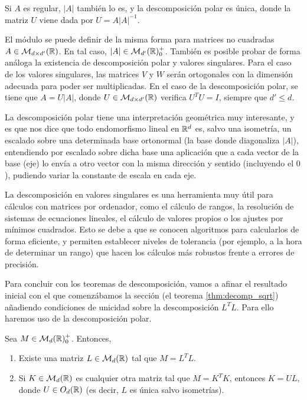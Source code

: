 \begin{remark}
    Si $A$ es regular, $|A|$ también lo es, y la descomposición polar es única, donde la matriz $U$ viene dada por $U = A|A|^{-1}$.
\end{remark}

\begin{remark} \label{rem:polar_generalized}
    El módulo se puede definir de la misma forma para matrices no cuadradas $A \in \mathcal{M}_{d \times d'}(\mathbb{R})$. En tal caso, $|A| \in \mathcal{M}_{d'}(\mathbb{R})^+_0$. También es posible probar de forma análoga la existencia de descomposición polar y valores singulares. Para el caso de los valores singulares, las matrices $V$ y $W$ serán ortogonales con la dimensión adecuada para poder ser multiplicadas. En el caso de la descomposición polar, se tiene que $A = U|A|$, donde $U \in \mathcal{M}_{d \times d'}(\mathbb{R})$ verifica $U^TU = I$, siempre que $d' \le d$.
\end{remark}

La descomposición polar tiene una interpretación geométrica muy interesante, y es que nos dice que todo endomorfismo lineal en $\mathbb{R}^d$ es, salvo una isometría, un escalado sobre una determinada base ortonormal (la base donde diagonaliza $|A|$), entendiendo por escalado sobre dicha base una aplicación que a cada vector de la base (eje) lo envía a otro vector con la misma dirección y sentido (incluyendo el $0$), pudiendo variar la constante de escala en cada eje.

La descomposición en valores singulares es una herramienta muy útil para cálculos con matrices por ordenador, como el cálculo de rangos, la resolución de sistemas de ecuaciones lineales, el cálculo de valores propios o los ajustes por mínimos cuadrados. Esto se debe a que se conocen algoritmos para calcularlos de forma eficiente, y permiten establecer niveles de tolerancia (por ejemplo, a la hora de determinar un rango) que hacen los cálculos más robustos frente a errores de precisión.

Para concluir con los teoremas de descomposición, vamos a afinar el resultado inicial con el que comenzábamos la sección (el teorema \ref{thm:decomp_sqrt}) añadiendo condiciones de unicidad sobre la descomposición $L^TL$. Para ello haremos uso de la descomposición polar.

\begin{thm} \label{thm:psd_decomposition}
    Sea $M \in \mathcal{M}_d(\mathbb{R})^+_0$. Entonces,
    \begin{enumerate}
        \item Existe una matriz $L \in \mathcal{M}_d(\mathbb{R})$ tal que $M = L^TL$.
        \item Si $K \in \mathcal{M}_d(\mathbb{R})$ es cualquier otra matriz tal que $M = K^TK$, entonces $K = UL$, donde $U \in O_d(\mathbb{R})$ (es decir, $L$ es única salvo isometrías).
    \end{enumerate}
\end{thm}

